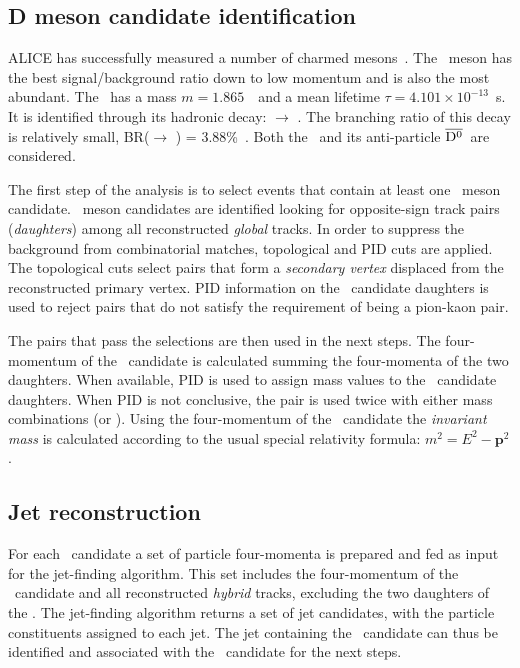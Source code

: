 \documentclass[a4paper]{jpconf}
\begin{document}
\subsection{D meson candidate identification}
ALICE has successfully measured a number of charmed mesons~\cite{ALICE:2012d, ALICE:2012e}.
The \Dzero\ meson has the best signal/background ratio down to low momentum and
is also the most abundant. The \Dzero\ has a mass $m=1.865$~\GeVcsq\ and a mean lifetime $\tau=4.101 \times 10^{-13}$~s.
It is identified through its hadronic decay: \Dzero $\rightarrow$ \pip \kam. The branching ratio of this decay
is relatively small, BR(\Dzero $\rightarrow$ \pip \kam) = 3.88\%~\cite{PDG:2014}. Both the \Dzero\ and its
anti-particle $\overline{\mathrm{D^{0}}}$~are considered.

The first step of the analysis is to select events that contain at least one \Dzero\ meson candidate.
\Dzero\ meson candidates are identified looking for opposite-sign track pairs (\emph{daughters}) among all reconstructed \emph{global} tracks.
In order to suppress the background from combinatorial matches, topological and PID cuts are applied.
The topological cuts select pairs that form a \emph{secondary vertex} displaced from the reconstructed
primary vertex. 
PID information on the \Dzero\ candidate daughters is used to reject pairs that do not satisfy the requirement of being a pion-kaon pair.

The pairs that pass the selections are then used in the next steps.
The four-momentum of the \Dzero\ candidate is calculated summing the four-momenta of the two daughters.
When available, PID is used to assign mass values to the \Dzero\ candidate daughters. When PID is not conclusive,
the pair is used twice with either mass combinations (\pip \kam or \pim \kap). Using the four-momentum of the \Dzero\ candidate
the \emph{invariant mass} is calculated according to the usual special relativity formula: $m^2 = E^2 - \bm{p}^2$.

\subsection{Jet reconstruction}
For each \Dzero\ candidate a set of particle four-momenta is prepared and fed as input for the jet-finding algorithm.
This set includes the four-momentum of the \Dzero\ candidate and all reconstructed \emph{hybrid} tracks,
excluding the two daughters of the \Dzero. The jet-finding algorithm returns a set of jet candidates, with the particle constituents
assigned to each jet. The jet containing the \Dzero\ candidate can thus be identified and associated with the \Dzero\ candidate for the next steps.
\end{document}
